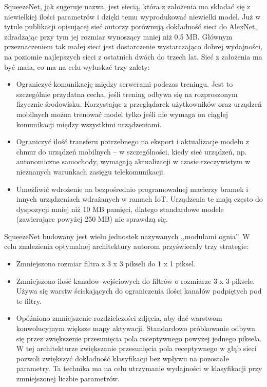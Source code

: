 \documentclass[12pt,a4paper,twoside,titlepage,openright]{book}
\begin{document}
SqueezeNet, jak sugeruje nazwa, jest siecią, która z założenia ma składać się z niewielkiej ilości parametrów i dzięki temu wyprodukować niewielki model. Już w tytule publikacji opisującej sieć autorzy porównują dokładność sieci do AlexNet, zdradzając przy tym jej rozmiar wynoszący mniej niż 0,5 MB. Głównym przeznaczeniem tak małej sieci jest dostarczenie wystarczająco dobrej wydajności, na poziomie najlepszych sieci z ostatnich dwóch do trzech lat. Sieć z założenia ma być mała, co ma na celu wyłuskać trzy zalety:
\begin{itemize}
\item Ograniczyć komunikację między serwerami podczas treningu. Jest to szczególnie przydatna cecha, jeśli trening odbywa się na rozproszonym fizycznie środowisku. Korzystając z przeglądarek użytkowników oraz urządzeń mobilnych można trenować model tylko jeśli nie wymaga on ciągłej komunikacji między wszystkimi urządzeniami.
\item Ograniczyć ilość transferu potrzebnego na eksport i aktualizacje modelu z chmur do urządzeń mobilnych -- w szczególności, kiedy sieć urządzeń, np. autonomiczne samochody, wymagają aktualizacji w czasie rzeczywistym w nieznanych warunkach zasięgu telekomunikacji.
\item Umożliwić wdrożenie na bezpośrednio programowalnej macierzy bramek i innych urządzeniach wdrażanych w ramach IoT. Urządzenia te mają często do dyspozycji mniej niż 10 MB pamięci, dlatego standardowe modele (zawierające powyżej 250 MB) nie sprawdzą się.
\end{itemize}

SqueezeNet budowany jest wielu jednostek nazywanych ,,modułami ognia''. 
W celu znalezienia optymalnej architektury autorom przyświecały trzy strategie:
\begin{itemize}
\item Zmniejszono rozmiar filtra z 3 x 3 pikseli do 1 x 1 piksel.
\item Zmniejszono ilość kanałow wejściowych do filtrów o rozmiarze 3 x 3 piksele. Używa się warstw ściskających do ograniczenia ilości kanałów podpiętych pod te filtry.
\item Opóźniono zmniejszenie rozdzielczości zdjęcia, aby dać warstwom konwolucyjnym większe mapy aktywacji. Standardowo próbkowanie odbywa się przez zwiększenie przesunięcia pola receptywnego powyżej jednego piksela. W tej architekturze zwiększanie przesunięcia pola receptywnego w głąb sieci pozwoli zwiększyć dokładność klasyfikacji bez wpływu na pozostałe parametry. Ta technika ma na celu utrzymanie wydajności w klasyfikacji przy zmniejszonej liczbie parametrów.
\end{itemize}
\end{document}
